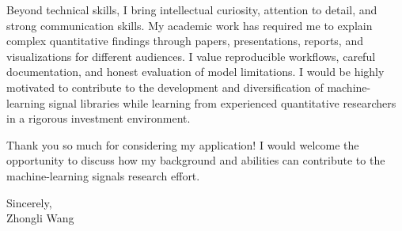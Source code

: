 \documentclass[11pt]{article}
\begin{document}
Beyond technical skills, I bring intellectual curiosity, attention to detail, and strong communication skills. My academic work has required me to explain complex quantitative findings through papers, presentations, reports, and visualizations for different audiences. I value reproducible workflows, careful documentation, and honest evaluation of model limitations. I would be highly motivated to contribute to the development and diversification of machine-learning signal libraries while learning from experienced quantitative researchers in a rigorous investment environment.

Thank you so much for considering my application! I would welcome the opportunity to discuss how my background and abilities can contribute to the machine-learning signals research effort.

\vspace{0.15cm}

\noindent Sincerely, \\[0.7cm]
\noindent Zhongli Wang
\end{document}
